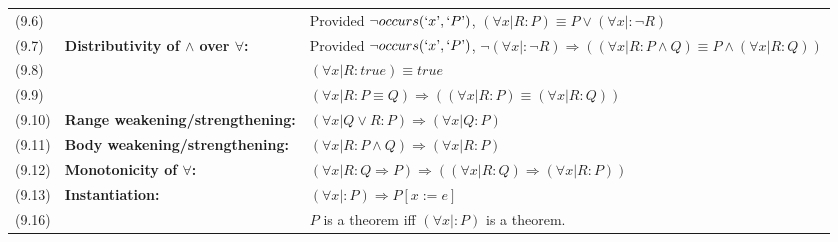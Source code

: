 \documentclass[letterpaper, 8pt]{extarticle}
\newcommand{\To}{\Rightarrow}
\begin{document}
\begin{multicols*}{3}
\begin{tabulary}{\linewidth}{@{}lLL@{}}
        (9.6)  &                                                           & Provided $\neg occurs(`x\textrm', `P\textrm')$, $(\forall x | R : P) \equiv P \lor (\forall x |: \neg R)$                                        \\
        (9.7)  & \textbf{Distributivity of $\land$ over $\forall$:}        & Provided $\neg occurs(`x\textrm', `P\textrm')$, $\neg(\forall x |: \neg R) \To ((\forall x | R : P \land Q) \equiv P \land (\forall x | R : Q))$ \\
        (9.8)  &                                                           & $(\forall x | R : true) \equiv true$                                                                                                             \\
        (9.9)  &                                                           & $(\forall x | R : P \equiv Q) \To ((\forall x | R : P) \equiv (\forall x | R : Q))$                                                              \\
        (9.10) & \textbf{Range weakening/strengthening:}                   & $(\forall x | Q \lor R : P) \To (\forall x | Q : P)$                                                                                             \\
        (9.11) & \textbf{Body weakening/strengthening:}                    & $(\forall x | R : P \land Q) \To (\forall x | R : P)$                                                                                            \\
        (9.12) & \textbf{Monotonicity of $\forall$:}                       & $(\forall x | R : Q \To P) \To ((\forall x | R : Q) \To (\forall x | R : P))$                                                                    \\
        (9.13) & \textbf{Instantiation:}                                   & $(\forall x |: P) \To P[x := e]$                                                                                                                 \\
        (9.16) &                                                           & $P$ is a theorem iff $(\forall x |: P)$ is a theorem.                                                                                            \\
    \end{tabulary}


\end{multicols*}
\end{document}
